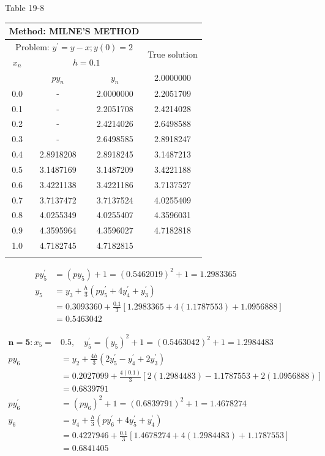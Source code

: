 \documentclass[10pt]{article}
\begin{document}
Table 19-8

\begin{center}
\begin{tabular}{|c|c|c|c|}
\hline
\multicolumn{3}{|c|}{Method: MILNE'S METHOD} &  \\
\hline
\multicolumn{3}{|c|}{Problem: $y^{\prime}=y-x ; y(0)=2$} & \multirow{2}{c|}{True solution} \\
\cline { 1 - 3 }
$x_{n}$ & \multicolumn{2}{|c|}{$h=0.1$} &  \\
\cline { 2 - 4 }
 & $p y_{n}$ & $y_{n}$ & 2.0000000 \\
\hline
0.0 & - & 2.0000000 & 2.2051709 \\
\hline
0.1 & - & 2.2051708 & 2.4214028 \\
\hline
0.2 & - & 2.4214026 & 2.6498588 \\
\hline
0.3 & - & 2.6498585 & 2.8918247 \\
\hline
0.4 & 2.8918208 & 2.8918245 & 3.1487213 \\
\hline
0.5 & 3.1487169 & 3.1487209 & 3.4221188 \\
\hline
0.6 & 3.4221138 & 3.4221186 & 3.7137527 \\
\hline
0.7 & 3.7137472 & 3.7137524 & 4.0255409 \\
\hline
0.8 & 4.0255349 & 4.0255407 & 4.3596031 \\
\hline
0.9 & 4.3595964 & 4.3596027 & 4.7182818 \\
\hline
1.0 & 4.7182745 & 4.7182815 &  \\
\hline
 &  &  &  \\
\hline
\end{tabular}
\end{center}

$$
\begin{aligned}
p y_{5}^{\prime} & =\left(p y_{5}\right)+1=(0.5462019)^{2}+1=1.2983365 \\
y_{5} & =y_{3}+\frac{h}{3}\left(p y_{5}^{\prime}+4 y_{4}^{\prime}+y_{3}^{\prime}\right) \\
& =0.3093360+\frac{0.1}{3}[1.2983365+4(1.1787553)+1.0956888] \\
& =0.5463042
\end{aligned}
$$

$$
\begin{aligned}
\mathbf{n = 5 :} x_{5}= & 0.5, \quad y_{5}^{\prime}=\left(y_{5}\right)^{2}+1=(0.5463042)^{2}+1=1.2984483 \\
p y_{6} & =y_{2}+\frac{4 h}{3}\left(2 y_{5}^{\prime}-y_{4}^{\prime}+2 y_{3}^{\prime}\right) \\
& =0.2027099+\frac{4(0.1)}{3}[2(1.2984483)-1.1787553+2(1.0956888)] \\
& =0.6839791 \\
p y_{6}^{\prime} & =\left(p y_{6}\right)^{2}+1=(0.6839791)^{2}+1=1.4678274 \\
y_{6} & =y_{4}+\frac{h}{3}\left(p y_{6}^{\prime}+4 y_{5}^{\prime}+y_{4}^{\prime}\right) \\
& =0.4227946+\frac{0.1}{3}[1.4678274+4(1.2984483)+1.1787553] \\
& =0.6841405
\end{aligned}
$$
\end{document}
